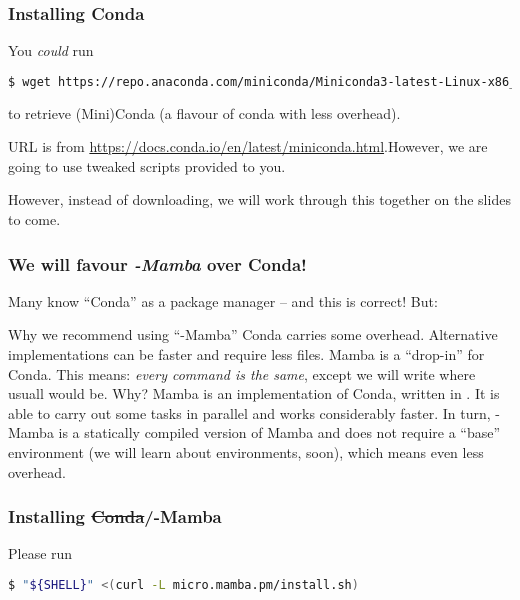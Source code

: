 \begin{frame}[fragile]
  \frametitle{Installing Conda}
  You \emph{could} run
  \begin{lstlisting}[language=Bash, style=Shell, basicstyle=\small,breaklines=true ]
$ wget https://repo.anaconda.com/miniconda/Miniconda3-latest-Linux-x86_64.sh
  \end{lstlisting}
  to retrieve (Mini)Conda (a flavour of conda with less overhead).
  \begin{hint}
  	\footnotesize URL is from \url{https://docs.conda.io/en/latest/miniconda.html}.\newline However, we are going to use tweaked scripts provided to you.
  \end{hint}
  \pause
  \begin{hint}
  	However, instead of downloading, we will work through this together on the slides to come.
  \end{hint}
\end{frame} 

\begin{frame}[fragile]
  \frametitle{We will favour \emph{\textmu-Mamba} over Conda!}
  Many know ``Conda'' as a package manager -- and this is correct! But:
  \begin{block}{Why we recommend using ``\textmu-Mamba''}
   Conda carries some overhead. Alternative implementations can be faster and require less files. Mamba is a ``drop-in'' for Conda. This means: \emph{every command is the same}, except we will write  where usuall  would be.\newline
   Why?\newline
   Mamba is an implementation of Conda, written in \CC{}. It is able to carry out some tasks in parallel and works considerably faster. In turn, \textmu-Mamba is a statically compiled version of Mamba and does not require a ``base'' environment (we will learn about environments, soon), which means even less overhead.
  \end{block}
\end{frame}

\begin{frame}[fragile]
	\frametitle{Installing \sout{Conda}/\textmu-Mamba}
	Please run
	\begin{lstlisting}[language=Bash, style=Shell]
$ "${SHELL}" <(curl -L micro.mamba.pm/install.sh)
	\end{lstlisting}
\end{frame}


